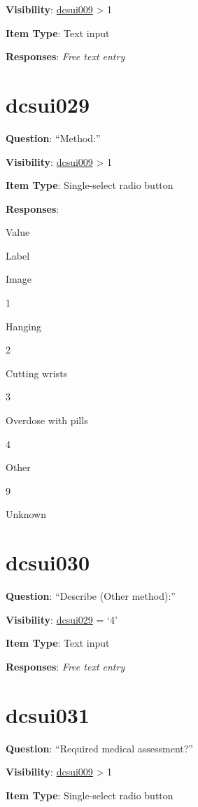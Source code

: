 \documentclass[]{book}
\begin{document}
\textbf{Visibility}: \protect\hyperlink{dcsui009}{dcsui009} \textgreater{} 1

\textbf{Item Type}: Text input

\textbf{Responses}: \emph{Free text entry}

\hypertarget{dcsui029}{%
\section{dcsui029}\label{dcsui029}}

\textbf{Question}: ``Method:''

\textbf{Visibility}: \protect\hyperlink{dcsui009}{dcsui009} \textgreater{} 1

\textbf{Item Type}: Single-select radio button

\textbf{Responses}:

Value

Label

Image

1

Hanging

2

Cutting wrists

3

Overdose with pills

4

Other

9

Unknown

\hypertarget{dcsui030}{%
\section{dcsui030}\label{dcsui030}}

\textbf{Question}: ``Describe (Other method):''

\textbf{Visibility}: \protect\hyperlink{dcsui029}{dcsui029} = `4'

\textbf{Item Type}: Text input

\textbf{Responses}: \emph{Free text entry}

\hypertarget{dcsui031}{%
\section{dcsui031}\label{dcsui031}}

\textbf{Question}: ``Required medical assessment?''

\textbf{Visibility}: \protect\hyperlink{dcsui009}{dcsui009} \textgreater{} 1

\textbf{Item Type}: Single-select radio button
\end{document}
